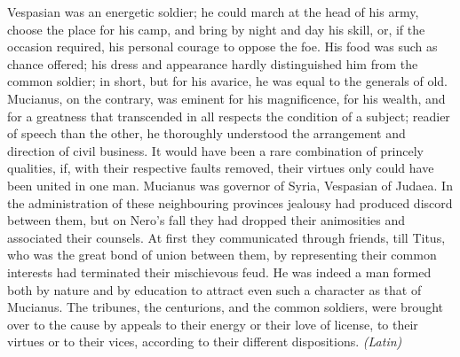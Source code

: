 
Vespasian was an energetic soldier; he could march at the head of his army, choose the place for his camp, and bring by night and day his skill, or, if the occasion required, his personal courage to oppose the foe. His food was such as chance offered; his dress and appearance hardly distinguished him from the common soldier; in short, but for his avarice, he was equal to the generals of old. Mucianus, on the contrary, was eminent for his magnificence, for his wealth, and for a greatness that transcended in all respects the condition of a subject; readier of speech than the other, he thoroughly understood the arrangement and direction of civil business. It would have been a rare combination of princely qualities, if, with their respective faults removed, their virtues only could have been united in one man. Mucianus was governor of Syria, Vespasian of Judaea. In the administration of these neighbouring provinces jealousy had produced discord between them, but on Nero's fall they had dropped their animosities and associated their counsels. At first they communicated through friends, till Titus, who was the great bond of union between them, by representing their common interests had terminated their mischievous feud. He was indeed a man formed both by nature and by education to attract even such a character as that of Mucianus. The tribunes, the centurions, and the common soldiers, were brought over to the cause by appeals to their energy or their love of license, to their virtues or to their vices, according to their different dispositions. \emph{(Latin)}


